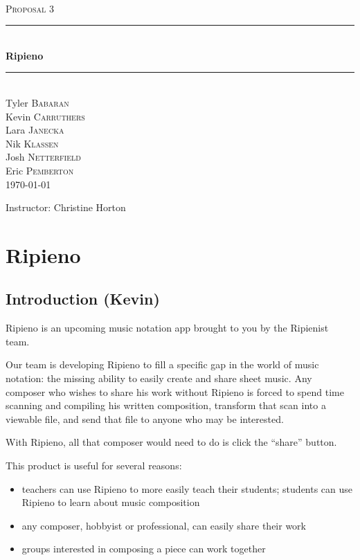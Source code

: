 \documentclass[12pt]{article}
\newcommand{\HRule}{\rule{\linewidth}{0.5mm}}
\begin{document}
\newpage

\begin{titlepage}
\begin{center}
\textsc{\LARGE }\\[1.5cm]
\textsc{\Large Proposal 3}\\[0.5cm]

\HRule \\[0.4cm]
{\huge \bfseries Ripieno}\\
\HRule \\[1.5cm]

Tyler \textsc{Babaran}\\
Kevin \textsc{Carruthers}\\
Lara \textsc{Janecka}\\
Nik \textsc{Klassen}\\
Josh \textsc{Netterfield}\\
Eric \textsc{Pemberton}\\

\vfill
{\large \today}
\end{center}

Instructor: Christine Horton
\end{titlepage}

\tableofcontents
\newpage

\section{Ripieno}
\subsection{Introduction (Kevin)}
Ripieno is an upcoming music notation app brought to you by the Ripienist team.

Our team is developing Ripieno to fill a specific gap in the world of music notation: the missing ability to easily create and share sheet music. Any composer who wishes to share his work without Ripieno is forced to spend time scanning and compiling his written composition, transform that scan into a viewable file, and send that file to anyone who may be interested.

With Ripieno, all that composer would need to do is click the ``share'' button.

This product is useful for several reasons:
\begin{itemize}
\item teachers can use Ripieno to more easily teach their students; students can use Ripieno to learn about music composition
\item any composer, hobbyist or professional, can easily share their work
\item groups interested in composing a piece can work together
\end{itemize}
\end{document}
